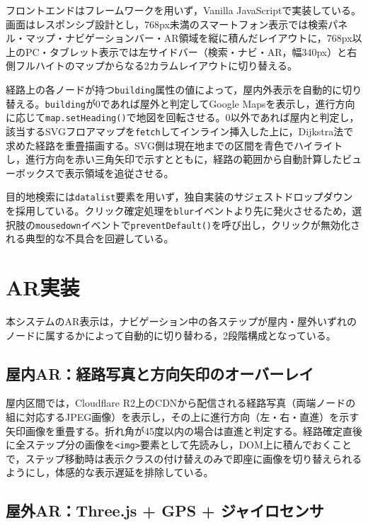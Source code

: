 \documentclass[a4paper,10.5pt]{ltjsarticle}
\begin{document}
フロントエンドはフレームワークを用いず，Vanilla JavaScriptで実装している。画面はレスポンシブ設計とし，768px未満のスマートフォン表示では検索パネル・マップ・ナビゲーションバー・AR領域を縦に積んだレイアウトに，768px以上のPC・タブレット表示では左サイドバー（検索・ナビ・AR，幅340px）と右側フルハイトのマップからなる2カラムレイアウトに切り替える。

経路上の各ノードが持つ\texttt{building}属性の値によって，屋内外表示を自動的に切り替える。\texttt{building}が0であれば屋外と判定してGoogle Mapsを表示し，進行方向に応じて\texttt{map.setHeading()}で地図を回転させる。0以外であれば屋内と判定し，該当するSVGフロアマップを\texttt{fetch}してインライン挿入した上に，Dijkstra法で求めた経路を重畳描画する。SVG側は現在地までの区間を青色でハイライトし，進行方向を赤い三角矢印で示すとともに，経路の範囲から自動計算したビューボックスで表示領域を追従させる。

目的地検索には\texttt{datalist}要素を用いず，独自実装のサジェストドロップダウンを採用している。クリック確定処理を\texttt{blur}イベントより先に発火させるため，選択肢の\texttt{mousedown}イベントで\texttt{preventDefault()}を呼び出し，クリックが無効化される典型的な不具合を回避している。

\section{AR実装}
\label{sec:ar}

本システムのAR表示は，ナビゲーション中の各ステップが屋内・屋外いずれのノードに属するかによって自動的に切り替わる，2段階構成となっている。

\subsection{屋内AR：経路写真と方向矢印のオーバーレイ}

屋内区間では，Cloudflare R2上のCDNから配信される経路写真（両端ノードの組に対応するJPEG画像）を表示し，その上に進行方向（左・右・直進）を示す矢印画像を重畳する。折れ角が45度以内の場合は直進と判定する。経路確定直後に全ステップ分の画像を\texttt{<img>}要素として先読みし，DOM上に積んでおくことで，ステップ移動時は表示クラスの付け替えのみで即座に画像を切り替えられるようにし，体感的な表示遅延を排除している。

\subsection{屋外AR：Three.js + GPS + ジャイロセンサ}
\end{document}
